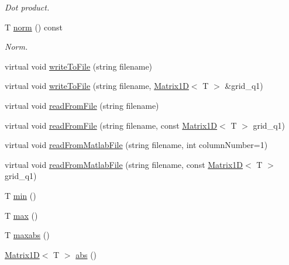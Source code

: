 \begin{DoxyCompactItemize}
\begin{DoxyCompactList}\small\item\em Dot product. \end{DoxyCompactList}\item 
T \hyperlink{class_matrix1_d_a2c9fcb0e9e2faf5a1650ddd3e4b095a6}{norm} () const 
\begin{DoxyCompactList}\small\item\em Norm. \end{DoxyCompactList}\item 
virtual void \hyperlink{class_matrix1_d_a5b45cf4994555efd741005534e3cc523}{write\+To\+File} (string filename)
\item 
virtual void \hyperlink{class_matrix1_d_a48a87ff7df5ad9c3a643ef67299ff331}{write\+To\+File} (string filename, \hyperlink{class_matrix1_d}{Matrix1\+D}$<$ T $>$ \&grid\+\_\+q1)
\item 
virtual void \hyperlink{class_matrix1_d_ab9b4a17c073f8794ae7e459816c1a935}{read\+From\+File} (string filename)
\item 
virtual void \hyperlink{class_matrix1_d_a6a89f2308563474cdbe95d67016f7483}{read\+From\+File} (string filename, const \hyperlink{class_matrix1_d}{Matrix1\+D}$<$ T $>$ grid\+\_\+q1)
\item 
virtual void \hyperlink{class_matrix1_d_ac26d2d71072abba536990c9eeda1aed2}{read\+From\+Matlab\+File} (string filename, int column\+Number=1)
\item 
virtual void \hyperlink{class_matrix1_d_a306e22d26353d241abe716d4fee9cd2f}{read\+From\+Matlab\+File} (string filename, const \hyperlink{class_matrix1_d}{Matrix1\+D}$<$ T $>$ grid\+\_\+q1)
\item 
T \hyperlink{class_matrix1_d_ae159f2f24d303d933888c6fc8b8caee0}{min} ()
\item 
T \hyperlink{class_matrix1_d_a216f6e6ae23697298280b6f8ce14a14d}{max} ()
\item 
T \hyperlink{class_matrix1_d_a0c7494e69113bf3b9c038e57d3997c9b}{maxabs} ()
\item 
\hyperlink{class_matrix1_d}{Matrix1\+D}$<$ T $>$ \hyperlink{class_matrix1_d_ad142af6526f3d758731982ecd57ec2f1}{abs} ()
\end{DoxyCompactItemize}
